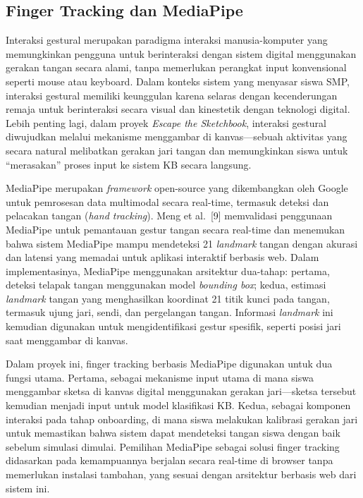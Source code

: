 \subsection{Finger Tracking dan MediaPipe}
\label{subsec:finger-tracking}

Interaksi gestural merupakan paradigma interaksi manusia-komputer yang memungkinkan pengguna untuk berinteraksi dengan sistem digital menggunakan gerakan tangan secara alami, tanpa memerlukan perangkat input konvensional seperti mouse atau keyboard. Dalam konteks sistem yang menyasar siswa SMP, interaksi gestural memiliki keunggulan karena selaras dengan kecenderungan remaja untuk berinteraksi secara visual dan kinestetik dengan teknologi digital. Lebih penting lagi, dalam proyek \textit{Escape the Sketchbook}, interaksi gestural diwujudkan melalui mekanisme menggambar di kanvas---sebuah aktivitas yang secara natural melibatkan gerakan jari tangan dan memungkinkan siswa untuk ``merasakan'' proses input ke sistem KB secara langsung.

MediaPipe merupakan \textit{framework} open-source yang dikembangkan oleh Google untuk pemrosesan data multimodal secara real-time, termasuk deteksi dan pelacakan tangan (\textit{hand tracking}). Meng et al.\ [9] memvalidasi penggunaan MediaPipe untuk pemantauan gestur tangan secara real-time dan menemukan bahwa sistem MediaPipe mampu mendeteksi 21 \textit{landmark} tangan dengan akurasi dan latensi yang memadai untuk aplikasi interaktif berbasis web. Dalam implementasinya, MediaPipe menggunakan arsitektur dua-tahap: pertama, deteksi telapak tangan menggunakan model \textit{bounding box}; kedua, estimasi \textit{landmark} tangan yang menghasilkan koordinat 21 titik kunci pada tangan, termasuk ujung jari, sendi, dan pergelangan tangan. Informasi \textit{landmark} ini kemudian digunakan untuk mengidentifikasi gestur spesifik, seperti posisi jari saat menggambar di kanvas.

Dalam proyek ini, finger tracking berbasis MediaPipe digunakan untuk dua fungsi utama. Pertama, sebagai mekanisme input utama di mana siswa menggambar sketsa di kanvas digital menggunakan gerakan jari---sketsa tersebut kemudian menjadi input untuk model klasifikasi KB. Kedua, sebagai komponen interaksi pada tahap onboarding, di mana siswa melakukan kalibrasi gerakan jari untuk memastikan bahwa sistem dapat mendeteksi tangan siswa dengan baik sebelum simulasi dimulai. Pemilihan MediaPipe sebagai solusi finger tracking didasarkan pada kemampuannya berjalan secara real-time di browser tanpa memerlukan instalasi tambahan, yang sesuai dengan arsitektur berbasis web dari sistem ini.

